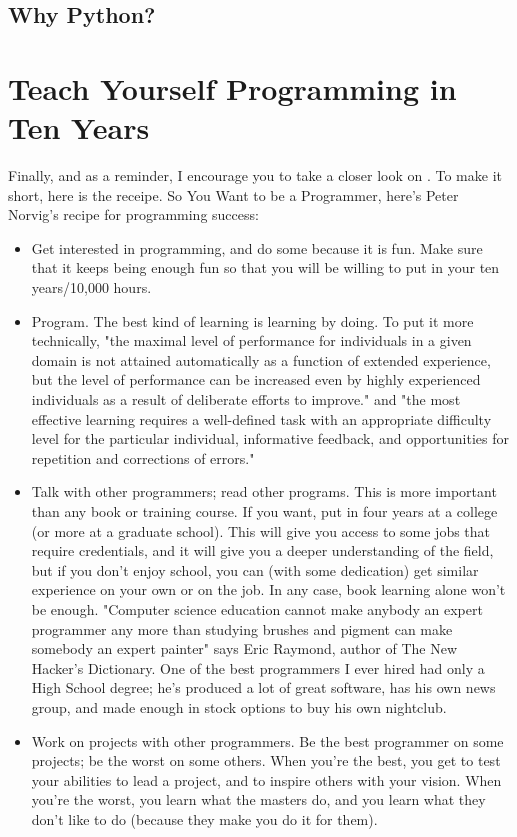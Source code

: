 \documentclass[12pt,a4paper,final,twoside,titlepage]{book}
\begin{document}
\subsection{Why Python?}


\section{Teach Yourself Programming in Ten Years}
Finally, and as a reminder, I encourage you to take a closer look on \cite{Peter-Norvig-10years}. To make it short, here is the receipe. So You Want to be a Programmer, here's Peter Norvig's recipe for programming success:
\begin{itemize}
\item Get interested in programming, and do some because it is fun. Make sure that it keeps being enough fun so that you will be willing to put in your ten years/10,000 hours.
\item Program. The best kind of learning is learning by doing. To put it more technically, "the maximal level of performance for individuals in a given domain is not attained automatically as a function of extended experience, but the level of performance can be increased even by highly experienced individuals as a result of deliberate efforts to improve." and "the most effective learning requires a well-defined task with an appropriate difficulty level for the particular individual, informative feedback, and opportunities for repetition and corrections of errors." 
\item Talk with other programmers; read other programs. This is more important than any book or training course.
If you want, put in four years at a college (or more at a graduate school). This will give you access to some jobs that require credentials, and it will give you a deeper understanding of the field, but if you don't enjoy school, you can (with some dedication) get similar experience on your own or on the job. In any case, book learning alone won't be enough. "Computer science education cannot make anybody an expert programmer any more than studying brushes and pigment can make somebody an expert painter" says Eric Raymond, author of The New Hacker's Dictionary. One of the best programmers I ever hired had only a High School degree; he's produced a lot of great software, has his own news group, and made enough in stock options to buy his own nightclub.
\item Work on projects with other programmers. Be the best programmer on some projects; be the worst on some others. When you're the best, you get to test your abilities to lead a project, and to inspire others with your vision. When you're the worst, you learn what the masters do, and you learn what they don't like to do (because they make you do it for them).

\end{itemize}
\end{document}
